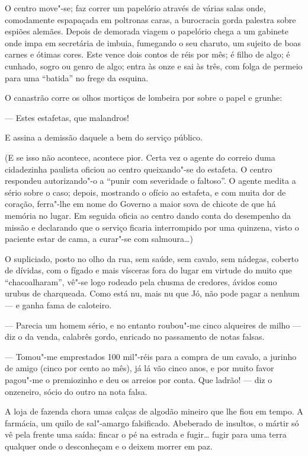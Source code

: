 O centro move"-se; faz correr um papelório através de várias salas onde,
comodamente espapaçada em poltronas caras, a burocracia gorda palestra
sobre espiões alemães. Depois de demorada viagem o papelório chega a um
gabinete onde impa em secretária de imbuia, fumegando o seu charuto, um
sujeito de boas carnes e ótimas cores. Este vence dois contos de réis
por mês; é filho de algo; é cunhado, sogro ou genro de algo; entra às
onze e sai às três, com folga de permeio para uma ``batida'' no frege da
esquina.

O canastrão corre os olhos mortiços de lombeira por sobre o papel e
grunhe:

--- Estes estafetas, que malandros!

E assina a demissão daquele a bem do serviço público.

(E se isso não acontece, acontece pior. Certa vez o agente do correio
duma cidadezinha paulista oficiou ao centro queixando"-se do estafeta. O
centro respondeu autorizando"-o a ``punir com severidade o faltoso''. O
agente medita a sério sobre o caso; depois, mostrando o ofício ao
estafeta, e com muita dor de coração, ferra"-lhe em nome do Governo a
maior sova de chicote de que há memória no lugar. Em seguida oficia ao
centro dando conta do desempenho da missão e declarando que o serviço
ficaria interrompido por uma quinzena, visto o paciente estar de cama, a
curar"-se com salmoura\ldots{})

O supliciado, posto no olho da rua, sem saúde, sem cavalo, sem nádegas,
coberto de dívidas, com o fígado e mais vísceras fora do lugar em
virtude do muito que ``chacoalharam'', vê"-se logo rodeado pela chusma de
credores, ávidos como urubus de charqueada. Como está nu, mais nu que
Jó, não pode pagar a nenhum --- e ganha fama de caloteiro.

--- Parecia um homem sério, e no entanto roubou"-me cinco alqueires de
milho --- diz o da venda, calabrês gordo, enricado no passamento de
notas falsas.

--- Tomou"-me emprestados 100 mil"-réis para a compra de um cavalo, a
jurinho de amigo (cinco por cento ao mês), já lá vão cinco anos, e por
muito favor pagou"-me o premiozinho e deu os arreios por conta. Que
ladrão! --- diz o onzeneiro, sócio do outro na nota falsa.

A loja de fazenda chora umas calças de algodão mineiro que lhe fiou em
tempo. A farmácia, um quilo de sal"-amargo falsificado. Abeberado de
insultos, o mártir só vê pela frente uma saída: fincar o pé na estrada e
fugir\ldots{} fugir para uma terra qualquer onde o desconheçam e o deixem
morrer em paz.

